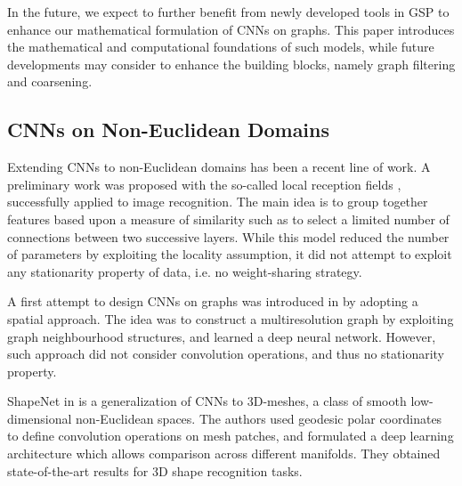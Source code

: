 \documentclass{article}
\newcommand{\todo}[1]{{\color{red} #1 }}
\begin{document}
In the future, we expect to
further benefit from newly developed tools in GSP to enhance our mathematical formulation of
CNNs on graphs. This paper introduces the mathematical and computational foundations of
such models, while future developments may consider to enhance the building
blocks, namely graph filtering and coarsening. 


\subsection{CNNs on Non-Euclidean Domains}




Extending CNNs to non-Euclidean domains has been a recent line of work. A preliminary work was proposed with 
 the so-called local reception fields \cite{pro:GregorLeCun10LRF,
pro:CoatesNg11LRF}, successfully applied to image recognition. The main idea is
to group together features based upon a measure of similarity such as to select
a limited number of connections between two successive layers. While this model
reduced the number of parameters by exploiting the locality assumption, it did
not attempt to exploit any stationarity property of data, i.e. no weight-sharing strategy. %


A first attempt to design CNNs on graphs was introduced in \cite{art:BrunaZarembaSzlamLeCun13DLgraphs} by adopting a spatial approach. The idea was to construct a multiresolution graph by exploiting graph neighbourhood structures, and learned a deep neural network. However, such approach did not consider convolution operations, and thus no stationarity property. %






ShapeNet in \cite{pro:MasciBoscainiBronsteinVandergheynst15GeoDL,
art:MasciBoscainiBronsteinVandergheynst15ShapeNet} is a generalization of CNNs
to 3D-meshes, a class of smooth low-dimensional non-Euclidean spaces. The
authors used geodesic polar coordinates to define convolution operations on mesh patches, and formulated a
deep learning architecture which allows comparison across different manifolds.
They obtained state-of-the-art results for 3D shape recognition tasks.
\end{document}
